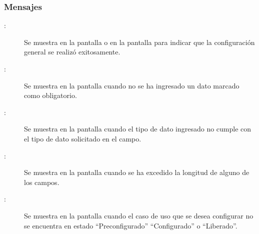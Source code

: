 \subsubsection{Mensajes}

	
\begin{description}
	\item[:] Se muestra en la pantalla  o en la pantalla  para indicar que la configuración general se realizó exitosamente.
	\item[:] Se muestra en la pantalla  cuando no se ha ingresado un dato marcado como obligatorio.
	\item[:] Se muestra en la pantalla  cuando el tipo de dato ingresado no cumple con el tipo de dato solicitado en el campo.
	\item [:] Se muestra en la pantalla  cuando se ha excedido la longitud de alguno de los campos.
	\item [:] Se muestra en la pantalla  cuando el caso de uso que se desea configurar no se encuentra en estado ``Preconfigurado'' ``Configurado'' o ``Liberado''.
	
\end{description}
